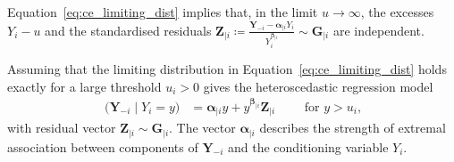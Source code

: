 \documentclass[
  12pt]{article}
\DeclareMathOperator{\CE}{\mathrm{CE}}
\begin{document}
Equation~\eqref{eq:ce_limiting_dist} implies that, in the limit $u\to\infty$, the excesses $Y_i-u$ and the standardised residuals $\symbf{Z}_{\mid i} \coloneqq \frac{\symbf{Y}_{-i} - \symbf{\alpha}_{\mid i} Y_{i}}{Y_{i}^{\symbf{\beta}_{\mid i}}} \sim \symbf{G}_{\mid i}$ are independent. 

Assuming that the limiting distribution in Equation~\eqref{eq:ce_limiting_dist} holds exactly for a large threshold $u_i > 0$ gives the heteroscedastic regression model
\begin{align}~\label{eq:ce_model}
  \bigl(\symbf{Y}_{-i} \mid Y_i = y \bigr) &= \symbf{\alpha}_{\mid i}y + y^{\symbf{\beta}_{\mid i}}\symbf{Z}_{\mid i}\qquad \text{ for } y > u_i,
\end{align}
with residual vector $\symbf{Z}_{\mid i} \sim \symbf{G}_{\mid i}$.
The vector $\symbf{\alpha}_{\mid i}$ describes the strength of extremal association between components of $\symbf{Y}_{-i}$ and the conditioning variable $Y_i$. 
\end{document}
